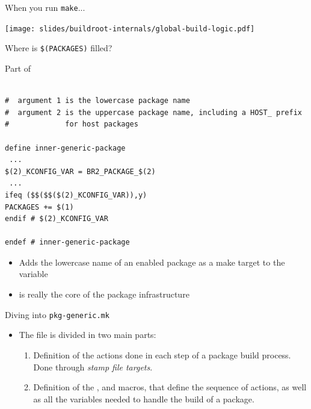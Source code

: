 \begin{frame}{When you run {\tt make}...}
  \begin{center}
    \texttt{[image: slides/buildroot-internals/global-build-logic.pdf]}
  \end{center}
\end{frame}

\begin{frame}[fragile]{Where is {\tt \$(PACKAGES)} filled?}

\begin{block}{Part of }
\begin{verbatim}

#  argument 1 is the lowercase package name
#  argument 2 is the uppercase package name, including a HOST_ prefix
#             for host packages

define inner-generic-package
 ...
$(2)_KCONFIG_VAR = BR2_PACKAGE_$(2)
 ...
ifeq ($$($$($(2)_KCONFIG_VAR)),y)
PACKAGES += $(1)
endif # $(2)_KCONFIG_VAR

endef # inner-generic-package
\end{verbatim}
\end{block}

\begin{itemize}
\item Adds the lowercase name of an enabled package as a make target
  to the  variable
\item {} is really the core of the package
  infrastructure
\end{itemize}

\end{frame}

\begin{frame}{Diving into {\tt pkg-generic.mk}}

\begin{itemize}
\item The  file is divided in two main
  parts:
  \begin{enumerate}
  \item Definition of the actions done in each step of a package build
    process. Done through {\em stamp file targets}.
  \item Definition of the ,
     and  macros,
    that define the sequence of actions, as well as all the variables
    needed to handle the build of a package.
  \end{enumerate}
\end{itemize}

\end{frame}

